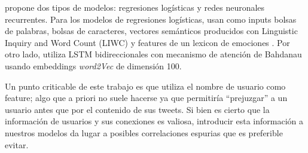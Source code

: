 \citet{gao-huang-2017-detecting} propone dos tipos de modelos: regresiones logísticas y redes neuronales recurrentes. Para los modelos de regresiones logísticas, usan como inputs bolsas de palabras, bolsas de caracteres, vectores semánticos producidos con Linguistic Inquiry and Word Count (LIWC) \cite{pennebaker2001linguistic} y features de un lexicon de emociones \cite{mohammad2013nrc}. Por otro lado, utiliza LSTM bidireccionales con mecanismo de atención de Bahdanau \cite{bahdanau2014neural} usando embeddings \emph{word2Vec} de dimensión 100.

Un punto criticable de este trabajo es que utiliza el nombre de usuario como feature; algo que a priori no suele hacerse ya que permitiría ``prejuzgar'' a un usuario antes que por el contenido de sus tweets. Si bien es cierto que la información de usuarios y sus conexiones es valiosa, introducir esta información a nuestros modelos da lugar a posibles correlaciones espurias que es preferible evitar.


